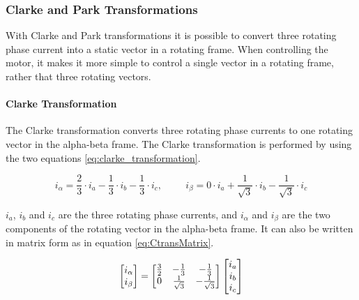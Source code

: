 
\subsubsection{Clarke and Park Transformations}
With Clarke and Park transformations it is possible to convert three rotating phase current into a static vector in a rotating frame. When controlling the motor, it makes it more simple to control a single vector in a rotating frame, rather that three rotating vectors.



\paragraph{Clarke Transformation}
The Clarke transformation converts three rotating phase currents to one rotating vector in the alpha-beta frame. The Clarke transformation is performed by using the two equations \ref{eq:clarke_transformation}.

\begin{equation}
    i_{\alpha} = \frac{2}{3} \cdot i_a - \frac{1}{3} \cdot i_b - \frac{1}{3} \cdot i_c
    , \hspace{1cm}
    i_{\beta} = 0 \cdot i_a + \frac{1}{\sqrt{3}} \cdot i_b - \frac{1}{\sqrt{3}} \cdot i_c
    \label{eq:clarke_transformation}
\end{equation}

$i_a$, $i_b$ and $i_c$ are the three rotating phase currents, and $i_\alpha$ and $i_\beta$ are the two components of the rotating vector in the alpha-beta frame.
It can also be written in matrix form as in equation \ref{eq:CtransMatrix}. 

\begin{equation}
    \centering
    \begin{bmatrix}
        i_{\alpha} \\ 
        i_{\beta}
    \end{bmatrix}
    =
    \begin{bmatrix}
        \frac{3}{2} & -\frac{1}{3} & -\frac{1}{3} \\
        0 & \frac{1}{\sqrt{3}} & -\frac{1}{\sqrt{3}} \\
    \end{bmatrix}
    \begin{bmatrix}
        i_{a} \\ 
        i_{b} \\ 
        i_{c}
    \end{bmatrix}
    \label{eq:CtransMatrix}
\end{equation}


